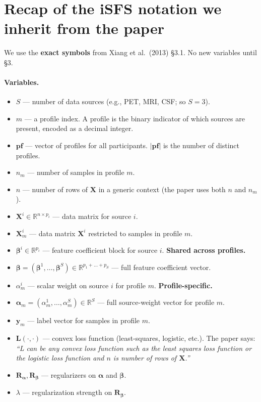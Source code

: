 \documentclass[11pt,a4paper]{article}
\begin{document}
\section{Recap of the iSFS notation we inherit from the paper}

We use the \textbf{exact symbols} from Xiang et al.\ (2013) \S 3.1. No new variables until \S 3.

\paragraph{Variables.}
\begin{itemize}[leftmargin=*,itemsep=2pt]
  \item $S$ --- number of data sources (e.g., PET, MRI, CSF; so $S = 3$).
  \item $m$ --- a profile index. A profile is the binary indicator of which sources are present, encoded as a decimal integer.
  \item $\mathbf{pf}$ --- vector of profiles for all participants. $|\mathbf{pf}|$ is the number of distinct profiles.
  \item $n_m$ --- number of samples in profile $m$.
  \item $n$ --- number of rows of $\mathbf{X}$ in a generic context (the paper uses both $n$ and $n_m$).
  \item $\mathbf{X}^i \in \mathbb{R}^{n \times p_i}$ --- data matrix for source $i$.
  \item $\mathbf{X}^i_m$ --- data matrix $\mathbf{X}^i$ restricted to samples in profile $m$.
  \item $\boldsymbol{\beta}^i \in \mathbb{R}^{p_i}$ --- feature coefficient block for source $i$. \textbf{Shared across profiles.}
  \item $\boldsymbol{\beta} = (\boldsymbol{\beta}^1, \ldots, \boldsymbol{\beta}^S) \in \mathbb{R}^{p_1 + \ldots + p_S}$ --- full feature coefficient vector.
  \item $\alpha^i_m$ --- scalar weight on source $i$ for profile $m$. \textbf{Profile-specific.}
  \item $\boldsymbol{\alpha}_m = (\alpha^1_m, \ldots, \alpha^S_m) \in \mathbb{R}^S$ --- full source-weight vector for profile $m$.
  \item $\mathbf{y}_m$ --- label vector for samples in profile $m$.
  \item $\mathbf{L}(\cdot, \cdot)$ --- convex loss function (least-squares, logistic, etc.). The paper says: \emph{``L can be any convex loss function such as the least squares loss function or the logistic loss function and $n$ is number of rows of $\mathbf{X}$.''}
  \item $\mathbf{R}_{\boldsymbol{\alpha}}, \mathbf{R}_{\boldsymbol{\beta}}$ --- regularizers on $\boldsymbol{\alpha}$ and $\boldsymbol{\beta}$.
  \item $\lambda$ --- regularization strength on $\mathbf{R}_{\boldsymbol{\beta}}$.
\end{itemize}
\end{document}
